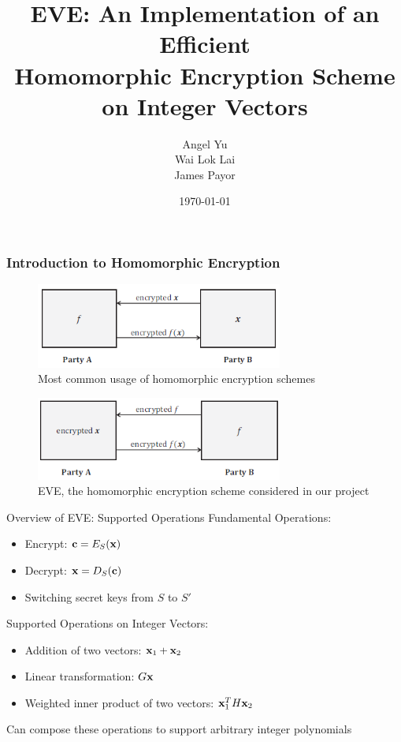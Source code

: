 \documentclass{beamer}
\title[EVE: Efficient Vector Encryption]{EVE: An Implementation of an Efficient \\ Homomorphic Encryption Scheme on Integer Vectors}
\author[Yu, Lai, Payor]{Angel Yu \\ Wai Lok Lai \\ James Payor}
\institute[MIT]
{
}
\date{\today}
\newcommand{\itz}[1]{\begin{itemize}#1\end{itemize}} %
\newcommand{\bbc}{{\bf c}} %
\newcommand{\bbx}{{\bf x}} %
\begin{document}
\begin{frame}
\titlepage
\end{frame}






\begin{frame}
\frametitle{Introduction to Homomorphic Encryption}

\begin{figure}[ht]
\centering
\includegraphics[width=3.2in]{he}
\caption{Most common usage of homomorphic encryption schemes}
\end{figure}

\begin{figure}[ht]
\centering
\includegraphics[width=3.2in]{eve}
\caption{EVE, the homomorphic encryption scheme considered in our project}
\end{figure}
\end{frame}





\begin{frame}{Overview of EVE: Supported Operations}
Fundamental Operations: 
\itz{
\item{Encrypt: $\bbc = E_S(\bbx)$}
\item{Decrypt: $\bbx = D_S(\bbc)$}
\item{Switching secret keys from $S$ to $S'$}
}
\vspace{.15in}
Supported Operations on Integer Vectors: 
\itz{
\item{Addition of two vectors: $\bbx_1 + \bbx_2$}
\item{Linear transformation: $G\bbx$}
\item{Weighted inner product of two vectors: $\bbx_1^T H \bbx_2$}
}
\vspace{.15in}
Can compose these operations to support arbitrary integer polynomials
\end{frame}
\end{document}
